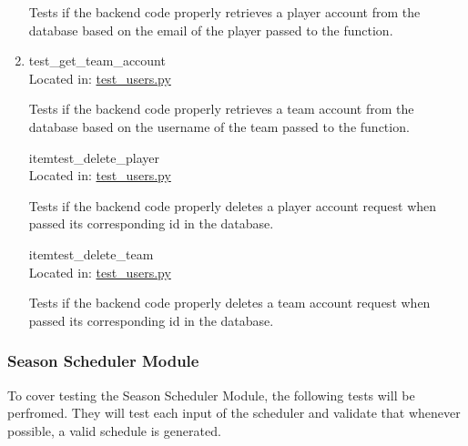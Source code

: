 \documentclass[12pt, titlepage]{article}
\begin{document}
\begin{enumerate}
  Tests if the backend code properly retrieves a player account from the database 
  based on the email of the player passed to the function.

  \item{test\_get\_team\_account\\}
  Located in: \href{https://github.com/Nicholas-Fabugais-Inaba/Sandlot/blob/pytest-workflow/test/test_users.py}{test\_users.py}
  
  Tests if the backend code properly retrieves a team account from the database 
  based on the username of the team passed to the function.

  item{test\_delete\_player\\}
  Located in: \href{https://github.com/Nicholas-Fabugais-Inaba/Sandlot/blob/pytest-workflow/test/test_users.py}{test\_users.py}
  
  Tests if the backend code properly deletes a player account request when passed its 
  corresponding id in the database.

  item{test\_delete\_team\\}
  Located in: \href{https://github.com/Nicholas-Fabugais-Inaba/Sandlot/blob/pytest-workflow/test/test_users.py}{test\_users.py}
  
  Tests if the backend code properly deletes a team account request when passed its 
  corresponding id in the database.


\end{enumerate}

\subsubsection{Season Scheduler Module}

To cover testing the Season Scheduler Module, the following tests will be
perfromed. They will test each input of the scheduler and validate that
whenever possible, a valid schedule is generated.
\end{document}
